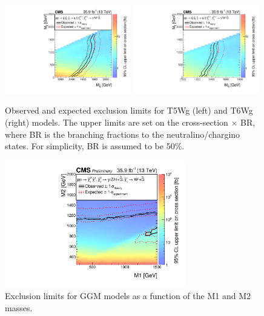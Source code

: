 \documentclass[thesis.tex]{subfiles}
\renewcommand\_{\textunderscore\allowbreak}
\begin{document}
\begin{figure}[tb]
  \centering
    \includegraphics[width=0.49\textwidth]{Fig/Figure_007-a.pdf}
    \includegraphics[width=0.49\textwidth]{Fig/Figure_007-b.pdf}
		\caption{Observed and expected exclusion limits for T5Wg (left) and T6Wg (right) models. The upper limits are set on the cross-section $\times$ BR, where BR is the branching fractions to the neutralino/chargino states. For simplicity, BR is assumed to be 50\%. }
    \label{fig:t5wglimit}
\end{figure}

\begin{figure}[tb]
  \centering
    \includegraphics[width=0.7\textwidth]{Fig/GGMXSEC.pdf}
    \caption{Exclusion limits for GGM models as a function of the M1 and M2 masses.}
     \label{fig:M1M2limit}
\end{figure}
\end{document}

